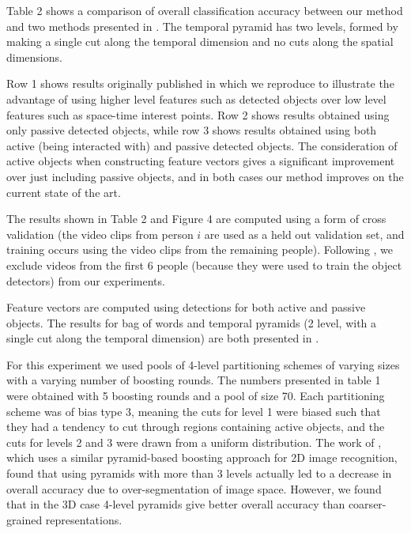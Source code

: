 \documentclass[10pt,twocolumn,letterpaper]{article}
\begin{document}
  Table 2 shows a comparison of overall classification accuracy between our
  method and two methods presented in \cite{Ramanan12}. The temporal pyramid
  has two levels, formed by making a single cut along the temporal
  dimension and no cuts along the spatial dimensions.
  
  Row 1 shows results originally published in \cite{Ramanan12} which we
  reproduce to illustrate the advantage of using higher level features such
  as detected objects over low level features such as space-time interest
  points.  Row 2 shows results
  obtained using only passive detected objects, while row 3 shows results obtained
  using both active (being interacted with) and passive detected objects.
  The consideration of active objects when constructing feature vectors
  gives a significant improvement over just including passive objects, and
  in both cases our method improves on the current state of the art.

	The results shown in Table 2 and Figure 4 are computed using a form of cross
	validation (the video clips from person $i$ are used as a held out validation set, and
	training occurs using the video clips from the remaining people).
  Following \cite{Ramanan12}, we exclude videos from the first 6 people
  (because they were used to train the object detectors) from our
  experiments.
  
  Feature vectors are computed using detections for both active and passive
  objects. The results for bag of words and temporal pyramids (2 level, with
  a single cut along the temporal dimension) are both presented in
  \cite{Ramanan12}.
  
  For this experiment we used pools of 4-level partitioning schemes of
  varying sizes with a varying number of boosting rounds. The numbers
  presented in table 1 were obtained with 5 boosting rounds and a pool of
  size 70.
  Each partitioning scheme was of bias type 3, meaning the cuts for level 1
  were biased such that they had a tendency to cut through regions containing
  active objects, and the cuts for levels 2 and 3 were drawn from a uniform
  distribution. The work of \cite{Jiang12}, which uses a similar
  pyramid-based boosting approach for 2D image recognition, found that using
  pyramids with more than 3 levels actually led to a decrease in overall
  accuracy due to over-segmentation of image space. However, we found that in the
  3D case 4-level pyramids give better overall accuracy than coarser-grained
  representations.
	
\end{document}
